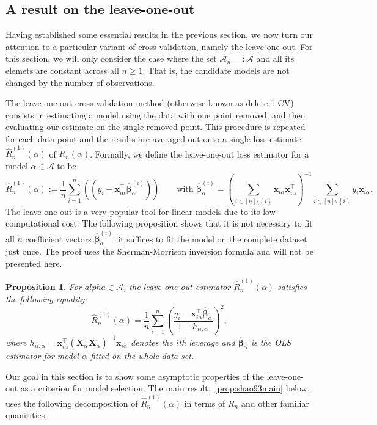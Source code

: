 \documentclass[11pt, letter paper]{article}
\newcommand{\1}{\mathmybb{1}}
\newtheorem{proposition}{Proposition}[section]
\newcommand{\0}{\emptyset}
\newcommand{\paren}[1]{\left(#1 \right)}
\newcommand{\set}[1]{\left\{ #1 \right\}}
\newcommand{\Acal}{\mathcal{A}_{n}}
\newcommand{\Tcal}{\mathcal{T}_{n}}
\newcommand{\X}{\boldsymbol{X}}
\newcommand{\x}{\boldsymbol{x}}
\newcommand{\bbetahat}{\boldsymbol{\hat{\beta}}}
\newcommand{\loocv}[1]{\hat{R}^{(1)}_{n}\paren{#1}}
\begin{document}
\subsection{A result on the leave-one-out}\label{sec:loo}
\renewcommand{\Acal}{\mathcal{A}}
\renewcommand{\Tcal}{\mathcal{T}}

Having established some essential results in the previous section, we now turn our attention to a particular variant of cross-validation, namely the leave-one-out. For this section, we will only consider the case where the set \(\Acal_{n}=:\Acal\) and all its elemets are constant across all \(n\geq 1\). That is, the candidate models are not changed by the number of observations.

The leave-one-out cross-validation method (otherwise known as delete-1 CV) consists in estimating a model using the data with one point removed, and then evaluating our estimate on the single removed point. This procedure is repeated for each data point and the results are averaged out onto a single loss estimate \(\loocv{\alpha}\) of \(R_{n}(\alpha)\). Formally, we define the leave-one-out loss estimator for a model \(\alpha\in\Acal\) to be 
\[\loocv{\alpha} := \frac{1}{n}\sum_{i=1}^{n}\paren{(y_{i} - \x_{i\alpha}^{\top}\bbetahat_{\alpha}^{(i)})}\qquad\text{with }\bbetahat_{\alpha}^{(i)} = \paren{\sum_{i\in[n]\setminus\set{i}}\x_{i\alpha}\x_{i\alpha}^{\top}}^{-1} \sum_{i\in[n]\setminus\set{i}} y_{i}\x_{i\alpha}.\]
The leave-one-out is a very popular tool for linear models due to its low computational cost. The following proposition shows that it is not necessary to fit all \(n\) coefficient vectors \(\bbetahat_{\alpha}^{(i)}\): it suffices to fit the model on the complete dataset just once. The proof uses the Sherman-Morrison inversion formula and will not be presented here.

\begin{proposition}
    For \(alpha\in\Acal\), the leave-one-out estimator \(\loocv{\alpha}\) satisfies the following equality:
    \[\loocv{\alpha}= \frac{1}{n}\sum_{i=1}^{n}\paren{\frac{y_{i}-\x_{i\alpha}^{\top}\bbetahat_{\alpha}}{1-h_{ii,\alpha}}}^{2},\]
    where \(h_{ii,\alpha} = \x_{i\alpha}^{\top}{(\X_{\alpha}^{\top}\X_{\alpha})}^{-1}\x_{i\alpha}\) denotes the \(i\)th leverage and \(\bbetahat_{\alpha}\) is the OLS estimator for model \(\alpha\) fitted on the whole data set.
\end{proposition}

Our goal in this section is to show some asymptotic properties of the leave-one-out as a criterion for model selection. The main result,~\ref{prop:shao93main} below, uses the following decomposition of \(\loocv{\alpha}\) in terms of \(R_{n}\) and other familiar quanitities.
\end{document}
